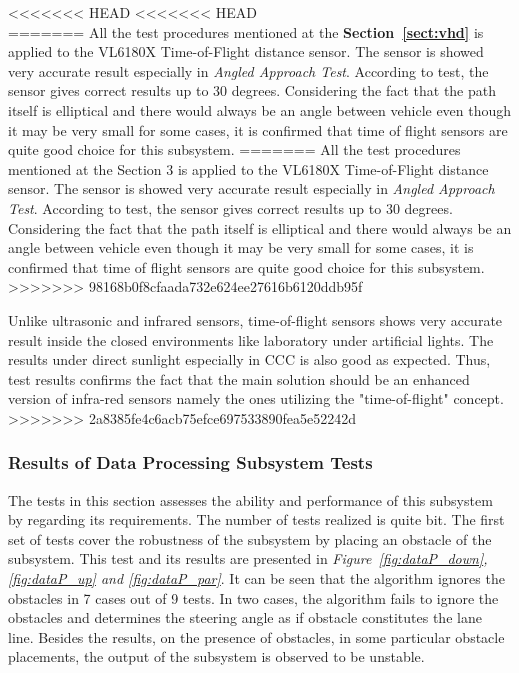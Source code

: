 \documentclass[a4paper,12pt]{article}
\begin{document}
<<<<<<< HEAD
<<<<<<< HEAD
		\\
=======
		All the test procedures mentioned at the \textbf{Section~\ref{sect:vhd}} is applied to the VL6180X Time-of-Flight distance sensor. The sensor is showed very accurate result especially in \textit{Angled Approach Test}. According to test, the sensor gives correct results up to 30 degrees. Considering the fact that the path itself is elliptical and there would always be an angle between vehicle even though it may be very small for some cases, it is confirmed that time of flight sensors are quite good choice for this subsystem.
=======
		All the test procedures mentioned at the Section 3 is applied to the VL6180X Time-of-Flight distance sensor. The sensor is showed very accurate result especially in \textit{Angled Approach Test}. According to test, the sensor gives correct results up to 30 degrees. Considering the fact that the path itself is elliptical and there would always be an angle between vehicle even though it may be very small for some cases, it is confirmed that time of flight sensors are quite good choice for this subsystem.
>>>>>>> 98168b0f8cfaada732e624ee27616b6120ddb95f
		
		Unlike ultrasonic and infrared sensors, time-of-flight sensors shows very accurate result inside the closed environments like laboratory under artificial lights. The results under direct sunlight especially in CCC is also good as expected.  Thus, test results confirms the fact that the main solution should be an enhanced version of infra-red sensors namely the ones utilizing the "time-of-flight" concept. 
>>>>>>> 2a8385fe4c6acb75efce697533890fea5e52242d
		
	
	
		
	
		
		
		
	\subsubsection*{Results of Data Processing Subsystem Tests}\label{sec:DataProcessingSubsystemTests}
	The tests in this section assesses the ability and performance of this subsystem by regarding its requirements. The number of tests realized is quite  bit. The first set of tests cover the robustness of the subsystem by placing an obstacle of the subsystem. This test and its results are presented in \textit{Figure~\ref{fig:dataP_down},\ref{fig:dataP_up} and \ref{fig:dataP_par}}. It can be seen that the algorithm ignores the obstacles in 7 cases out of 9 tests. In two cases, the algorithm fails to ignore the obstacles and determines the steering angle as if obstacle constitutes the lane line. Besides the results, on the presence of obstacles, in some particular obstacle placements, the output of the subsystem is observed to be unstable.
	
\end{document}
